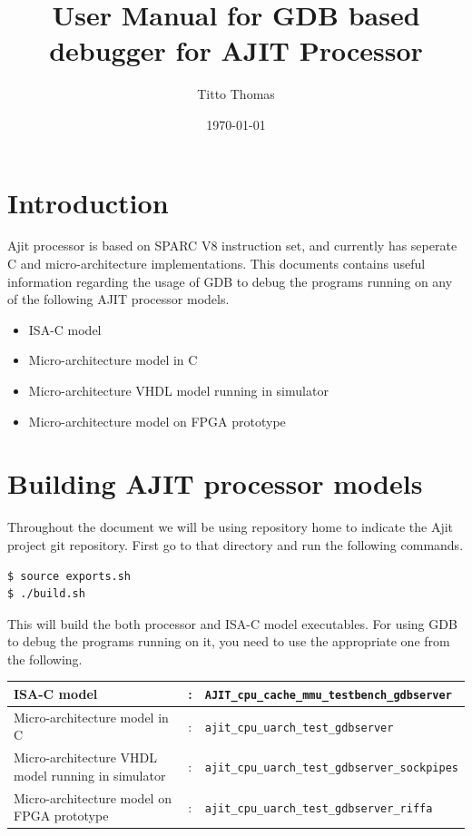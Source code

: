 \documentclass[a4paper, 11pt]{article}
\title{User Manual for GDB based debugger for AJIT Processor}
\author{Titto Thomas}
\date{\today}
\begin{document}
\maketitle

\section{Introduction}

Ajit processor is based on SPARC V8 instruction set, and currently has seperate C and micro-architecture implementations. This documents contains useful information regarding the usage of GDB to debug the programs running on any of the following AJIT processor models.

\begin{itemize}
	\item ISA-C model
	\item Micro-architecture model in C
	\item Micro-architecture VHDL model running in simulator
	\item Micro-architecture model on FPGA prototype
\end{itemize}

\section{Building AJIT processor models}
Throughout the document we will be using repository home to indicate the Ajit project git repository. First go to that directory and run the following commands.

\begin{lstlisting}[language=bash]
$ source exports.sh
$ ./build.sh
\end{lstlisting}
This will build the both processor and ISA-C model executables. For using GDB to debug the programs running on it, you need to use the appropriate one from the following.

\vspace*{5mm}

\begin{tabular}{L{4cm} C{5mm} L{10cm}}
	\hline
	ISA-C model & : & \texttt{AJIT\_cpu\_cache\_mmu\_testbench\_gdbserver}\\ \hline
	Micro-architecture model in C & : & \texttt{ajit\_cpu\_uarch\_test\_gdbserver}\\ \hline
	Micro-architecture VHDL model running in simulator & : & \texttt{ajit\_cpu\_uarch\_test\_gdbserver\_sockpipes}\\ \hline
	Micro-architecture model on FPGA prototype & : & \texttt{ajit\_cpu\_uarch\_test\_gdbserver\_riffa}\\ \hline
\end{tabular}
\end{document}
